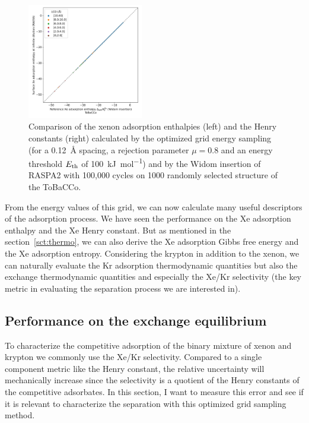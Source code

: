 \documentclass[main]{subfiles}
\begin{document}
\begin{figure}[ht]
  \centering
    \includegraphics[width=0.45\textwidth]{figures/3-fastsim/H_Xe_0_widom_vs_Enthalpy_grid_kjmol_overview_tobacco.jpeg}
    \caption{Comparison of the xenon adsorption enthalpies (left) and the Henry constants (right) calculated by the optimized grid energy sampling (for a \SI{0.12}{\angstrom} spacing, a rejection parameter $\mu=0.8$ and an energy threshold $E_{\text{th}}$ of \SI{100}{\kilo\joule\per\mole}) and by the Widom insertion of RASPA2 with 100,000 cycles on 1000 randomly selected structure of the ToBaCCo.\autocite{Colon_2017} }\label{fgr:grid_tobacco}
\end{figure}

From the energy values of this grid, we can now calculate many useful descriptors of the adsorption process. We have seen the performance on the Xe adsorption enthalpy and the Xe Henry constant. But as mentioned in the section~\ref{sct:thermo}, we can also derive the Xe adsorption Gibbs free energy and the Xe adsorption entropy. Considering the krypton in addition to the xenon, we can naturally evaluate the Kr adsorption thermodynamic quantities but also the exchange thermodynamic quantities and especially the Xe/Kr selectivity (the key metric in evaluating the separation process we are interested in).


\subsection{Performance on the exchange equilibrium}

To characterize the competitive adsorption of the binary mixture of xenon and krypton we commonly use the Xe/Kr selectivity. Compared to a single component metric like the Henry constant, the relative uncertainty will mechanically increase since the selectivity is a quotient of the Henry constants of the competitive adsorbates. In this section, I want to measure this error and see if it is relevant to characterize the separation with this optimized grid sampling method.
\end{document}
